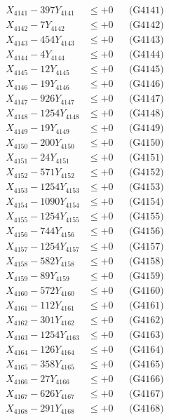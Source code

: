 \documentclass[a4paper,10pt]{article}
\begin{document}
{\begin{align}
\allowbreak
X_{4141} - 397Y_{4141} &\leq +0 && \text{(G4141)} \\
X_{4142} - 7Y_{4142} &\leq +0 && \text{(G4142)} \\
X_{4143} - 454Y_{4143} &\leq +0 && \text{(G4143)} \\
X_{4144} - 4Y_{4144} &\leq +0 && \text{(G4144)} \\
X_{4145} - 12Y_{4145} &\leq +0 && \text{(G4145)} \\
X_{4146} - 19Y_{4146} &\leq +0 && \text{(G4146)} \\
X_{4147} - 926Y_{4147} &\leq +0 && \text{(G4147)} \\
X_{4148} - 1254Y_{4148} &\leq +0 && \text{(G4148)} \\
X_{4149} - 19Y_{4149} &\leq +0 && \text{(G4149)} \\
X_{4150} - 200Y_{4150} &\leq +0 && \text{(G4150)} \\
\allowbreak
X_{4151} - 24Y_{4151} &\leq +0 && \text{(G4151)} \\
X_{4152} - 571Y_{4152} &\leq +0 && \text{(G4152)} \\
X_{4153} - 1254Y_{4153} &\leq +0 && \text{(G4153)} \\
X_{4154} - 1090Y_{4154} &\leq +0 && \text{(G4154)} \\
X_{4155} - 1254Y_{4155} &\leq +0 && \text{(G4155)} \\
X_{4156} - 744Y_{4156} &\leq +0 && \text{(G4156)} \\
X_{4157} - 1254Y_{4157} &\leq +0 && \text{(G4157)} \\
X_{4158} - 582Y_{4158} &\leq +0 && \text{(G4158)} \\
X_{4159} - 89Y_{4159} &\leq +0 && \text{(G4159)} \\
X_{4160} - 572Y_{4160} &\leq +0 && \text{(G4160)} \\
\allowbreak
X_{4161} - 112Y_{4161} &\leq +0 && \text{(G4161)} \\
X_{4162} - 301Y_{4162} &\leq +0 && \text{(G4162)} \\
X_{4163} - 1254Y_{4163} &\leq +0 && \text{(G4163)} \\
X_{4164} - 126Y_{4164} &\leq +0 && \text{(G4164)} \\
X_{4165} - 358Y_{4165} &\leq +0 && \text{(G4165)} \\
X_{4166} - 27Y_{4166} &\leq +0 && \text{(G4166)} \\
X_{4167} - 626Y_{4167} &\leq +0 && \text{(G4167)} \\
X_{4168} - 291Y_{4168} &\leq +0 && \text{(G4168)} \\

\end{align}}
\end{document}
